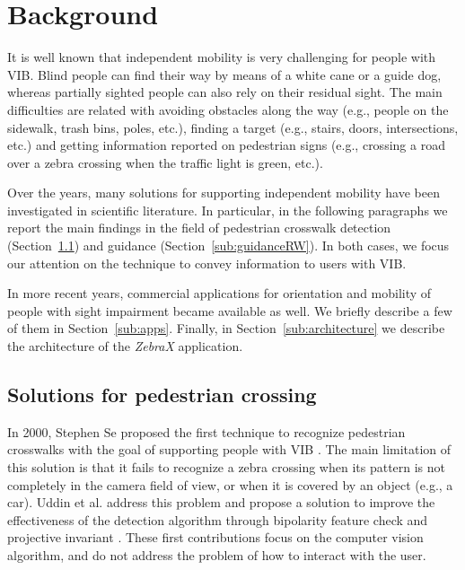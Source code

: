 \documentclass{article}
\newcommand{\zebra}{\emph{ZebraX}}
\begin{document}
\section{Background}
\label{sec:background}
It is well known that independent mobility is very challenging for people with VIB.
Blind people can find their way by means of a white cane or a guide dog, whereas partially sighted people can also rely on their residual sight.
The main difficulties are related with avoiding obstacles along the way (e.g., people on the sidewalk, trash bins, poles, etc.), finding a target (e.g., stairs, doors, intersections, etc.) and getting information reported on pedestrian signs (e.g., crossing a road over a zebra crossing when the traffic light is green, etc.).

Over the years, many solutions for supporting independent mobility have been investigated in scientific literature. In particular, in the following paragraphs we report the main findings in the field of pedestrian crosswalk detection (Section~\ref{sub:pedestrianRW}) and guidance (Section~\ref{sub:guidanceRW}).
In both cases, we focus our attention on the technique to convey information to users with VIB. 

In more recent years, commercial applications for orientation and mobility of people with sight impairment became available as well. We briefly describe a few of them in Section~\ref{sub:apps}.
Finally, in Section~\ref{sub:architecture} we describe the architecture of the \zebra{} application.

\subsection{Solutions for pedestrian crossing}
\label{sub:pedestrianRW}
In 2000, Stephen Se proposed the first technique to recognize pedestrian crosswalks with the goal of supporting people with VIB \cite{se}.
The main limitation of this solution is that it fails to recognize a zebra crossing when its pattern is not completely in the camera field of view, or when it is covered by an object (e.g., a car).
Uddin et al. address this problem and propose a solution to improve the effectiveness of the detection algorithm through bipolarity feature check and projective invariant \cite{uddin1,uddin2}.
These first contributions focus on the computer vision algorithm, and do not address the problem of how to interact with the user.
\end{document}
